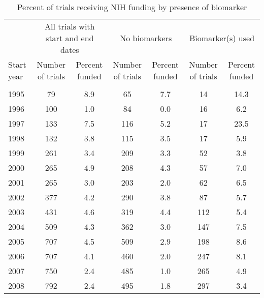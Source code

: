 \begin{table}[htbp]\centering
\caption{Percent of trials receiving NIH funding by presence of biomarker}
\begin{tabular}{l*{3}{cc}}
\hline\hline
                    &\multicolumn{2}{c}{All trials with start and end dates}&\multicolumn{2}{c}{No biomarkers}&\multicolumn{2}{c}{Biomarker(s) used}\\
Start year          &Number of trials&Percent funded&Number of trials&Percent funded&Number of trials&Percent funded\\
\hline
                    &            &            &            &            &            &            \\
1995                &          79&         8.9&          65&         7.7&          14&        14.3\\
1996                &         100&         1.0&          84&         0.0&          16&         6.2\\
1997                &         133&         7.5&         116&         5.2&          17&        23.5\\
1998                &         132&         3.8&         115&         3.5&          17&         5.9\\
1999                &         261&         3.4&         209&         3.3&          52&         3.8\\
2000                &         265&         4.9&         208&         4.3&          57&         7.0\\
2001                &         265&         3.0&         203&         2.0&          62&         6.5\\
2002                &         377&         4.2&         290&         3.8&          87&         5.7\\
2003                &         431&         4.6&         319&         4.4&         112&         5.4\\
2004                &         509&         4.3&         362&         3.0&         147&         7.5\\
2005                &         707&         4.5&         509&         2.9&         198&         8.6\\
2006                &         707&         4.1&         460&         2.0&         247&         8.1\\
2007                &         750&         2.4&         485&         1.0&         265&         4.9\\
2008                &         792&         2.4&         495&         1.8&         297&         3.4\\

\end{tabular}
\end{table}
